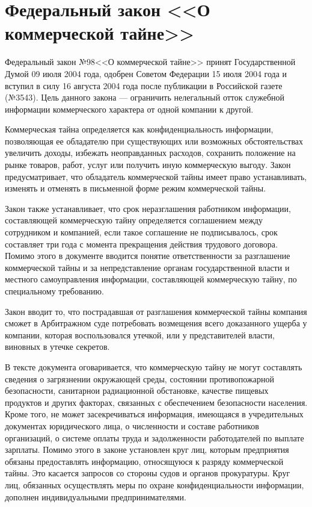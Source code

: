 \section{Федеральный закон <<О коммерческой тайне>>} \label{rights_98}

Федеральный закон №98 <<О коммерческой тайне>> принят Государственной Думой 09 июля 2004 года, одобрен Советом Федерации 15 июля 2004 года и вступил в силу 16 августа 2004 года после публикации в Российской газете (№3543).
Цель данного закона --- ограничить нелегальный отток служебной информации коммерческого характера от одной компании к другой.

\vspace{\baselineskip}
Коммерческая тайна определяется как конфиденциальность информации, позволяющая ее обладателю при существующих или возможных обстоятельствах увеличить доходы, избежать неоправданных расходов, сохранить положение на рынке товаров, работ, услуг или получить иную коммерческую выгоду.
Закон предусматривает, что обладатель коммерческой тайны имеет право устанавливать, изменять и отменять в письменной форме режим коммерческой тайны.

Закон также устанавливает, что срок неразглашения работником информации, составляющей коммерческую тайну определяется соглашением между сотрудником и компанией, если такое соглашение не подписывалось, срок составляет три года с момента прекращения действия трудового договора. Помимо этого в документе вводится понятие ответственности за разглашение коммерческой тайны и за непредставление органам государственной власти и местного самоуправления информации, составляющей коммерческую тайну, по специальному требованию.

\vspace{\baselineskip}
Закон вводит то, что пострадавшая от разглашения коммерческой тайны компания сможет в Арбитражном суде потребовать возмещения всего доказанного ущерба у компании, которая воспользовался утечкой, или у представителей власти, виновных в утечке секретов.

\vspace{\baselineskip}
В тексте документа оговаривается, что коммерческую тайну не могут составлять сведения о загрязнении окружающей среды, состоянии противопожарной безопасности, санитарно и радиационной обстановке, качестве пищевых продуктов и других факторах, связанных с обеспечением безопасности населения. Кроме того, не может засекречиваться информация, имеющаяся в учредительных документах юридического лица, о численности и составе работников организаций, о системе оплаты труда и задолженности работодателей по выплате зарплаты. Помимо этого в законе установлен круг лиц, которым предприятия обязаны предоставлять информацию, относящуюся к разряду коммерческой тайны. Это касается запросов со стороны судов и органов прокуратуры. Круг лиц, обязанных осуществлять меры по охране конфиденциальности информации, дополнен индивидуальными предпринимателями.

